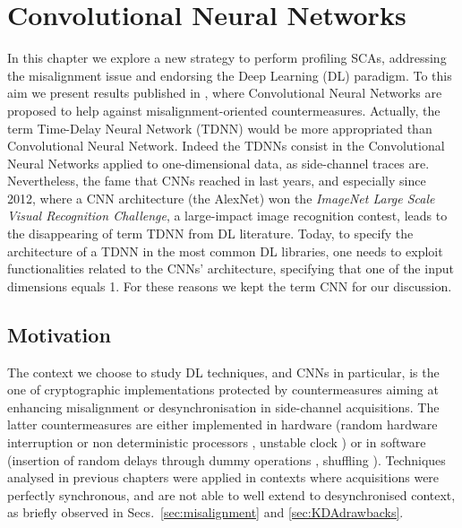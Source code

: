 
\chapter{Convolutional Neural Networks} %
\label{ChapterCNN}


In this chapter we explore a new strategy to perform profiling SCAs, addressing the misalignment issue and endorsing the Deep Learning (DL) paradigm. To this aim we present results published in \cite{DBLP:conf/ches/CagliDP17}, where Convolutional Neural Networks are proposed to help against misalignment-oriented countermeasures. Actually, the term Time-Delay Neural Network (TDNN) would be more appropriated than Convolutional Neural Network. Indeed the TDNNs  \cite{lang1990time} consist in the Convolutional Neural Networks applied to one-dimensional data, as side-channel traces are. Nevertheless, the fame that CNNs reached in last years, and especially since 2012, where a CNN architecture (the \textquotedbl AlexNet\textquotedbl) \cite{KSH12}  won the \emph{ImageNet Large Scale Visual Recognition Challenge}, a large-impact image recognition contest, leads to the disappearing of term TDNN from DL literature. Today, to specify the architecture of a TDNN in the most common DL libraries, one needs to exploit functionalities related to the CNNs' architecture, specifying \eg that one of the input dimensions equals 1. For these reasons we kept the term CNN for our discussion. 

\section{Motivation}
The context we choose to study DL techniques, and CNNs in particular, is the one of cryptographic implementations protected by countermeasures aiming at enhancing misalignment or desynchronisation in side-channel acquisitions. The latter countermeasures are either implemented in hardware (random hardware interruption or non deterministic processors \cite{irwin2002instruction,may2001non}, unstable clock \cite{moore2002improving,moore2003balanced}) or in software (insertion of random delays through dummy operations \cite{coron2009efficient,coron2010analysis}, shuffling \cite{veyrat2012shuffling}). Techniques analysed in previous chapters were applied in contexts where acquisitions were perfectly synchronous, and are not able to well extend to desynchronised context, as briefly observed in Secs.~\ref{sec:misalignment} and \ref{sec:KDAdrawbacks}.\\

